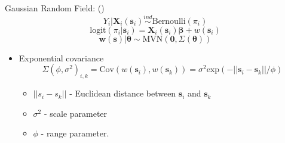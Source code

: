 \documentclass{beamer}
\begin{document}
\begin{frame}{Gaussian Random Field: ()}{} %
$$ Y_{i}|\mathbf{X}_{i}(\mathbf{s}_{i}) \stackrel{ind}{\sim} \mbox{Bernoulli}(\pi_{i}) $$
$$\text{logit}(\pi_{i}|\pmb{s}_{i}) = \mathbf{X}_{i}(\mathbf{s}_{i})\pmb{\beta} + w(\pmb{s}_{i}) $$
$$\pmb{w}(\pmb{s}) | \pmb{\theta} \sim \text{MVN}(\pmb{0}, \Sigma(\pmb{\theta}))$$
\begin{itemize}
\addtolength{\itemsep}{0.5\baselineskip}
\item Exponential covariance
$$ \Sigma(\phi, \sigma^{2})_{i,k} = \text{Cov}(w(\pmb{s}_{i}), w(\pmb{s}_{k})) =  \sigma^{2} \text{exp}(-||\pmb{s}_{i} - \pmb{s}_{k}||/\phi)$$
  \begin{itemize}
  \addtolength{\itemsep}{0.5\baselineskip}
  \item $||s_{i} - s_{k}||$ - Euclidean distance between $\pmb{s}_{i}$ and $\pmb{s}_{k}$
  \item $\sigma^{2}$ - scale parameter
  \item $\phi$ - range parameter.
  \end{itemize}
\end{itemize}
\end{frame}
\end{document}
